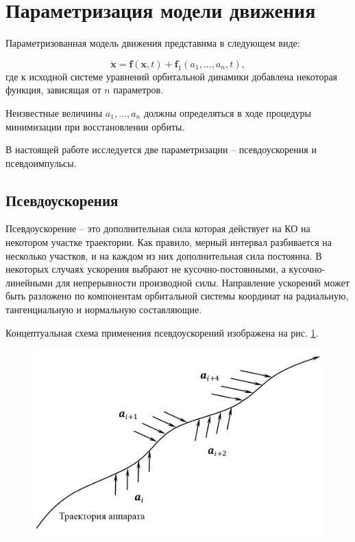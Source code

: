 \section{Параметризация модели движения}
\label{sec:Chapter2} 

Параметризованная модель движения представима в следующем виде:

\begin{equation*}
    \ddot{\mathbf{x}} = \mathbf{f}(\mathbf{x}, t) +
    \mathbf{f}_1(a_1, \dots, a_n, t),
\end{equation*}
где к исходной системе уравнений орбитальной динамики добавлена
некоторая функция, зависящая от $n$ параметров.

Неизвестные величины $a_1, \dots, a_n$ должны определяться в ходе процедуры минимизации при
восстановлении орбиты.

В настоящей работе исследуется две параметризации -- псевдоускорения и псевдоимпульсы.

\subsection{Псевдоускорения}

Псевдоускорение -- это дополнительная сила которая действует на КО на некотором участке 
траектории. Как правило, мерный интервал разбивается на несколько участков, и на каждом
из них дополнительная сила постоянна. В некоторых случаях ускорения выбрают не
кусочно-постоянными, а кусочно-линейными для непрерывности производной силы.
Направление ускорений может быть разложено по компонентам орбитальной системы координат на радиальную, тангенциальную и нормальную
составляющие. 

Концептуальная схема применения псевдоускорений изображена на рис. \ref{fig:pseudoacc}.

\begin{figure}[h!]
    \centering
    \includegraphics[width=0.8\linewidth]{../images/solution/lageos/pseudoacc.png}
    \label{fig:pseudoacc}
 \end{figure}


